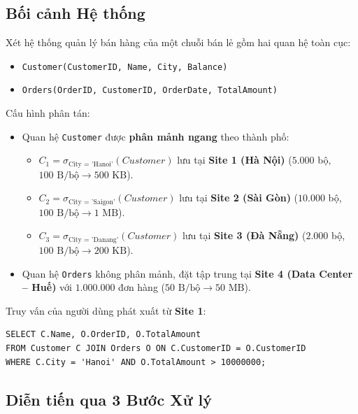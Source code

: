 \documentclass[12pt,a4paper]{report}
\begin{document}
\subsection{Bối cảnh Hệ thống}
Xét hệ thống quản lý bán hàng của một chuỗi bán lẻ gồm hai quan hệ toàn cục:
\begin{itemize}[leftmargin=0.8cm, topsep=1pt, itemsep=1pt]
    \item \texttt{Customer(CustomerID, Name, City, Balance)}
    \item \texttt{Orders(OrderID, CustomerID, OrderDate, TotalAmount)}
\end{itemize}
Cấu hình phân tán:
\begin{itemize}[leftmargin=0.8cm, topsep=1pt, itemsep=1pt]
    \item Quan hệ \texttt{Customer} được \textbf{phân mảnh ngang} theo thành phố:
    \begin{itemize}
        \item $C_1 = \sigma_{\text{City = 'Hanoi'}}(Customer)$ lưu tại \textbf{Site 1 (Hà Nội)} ($5.000$ bộ, $100\text{ B/bộ} \rightarrow 500\text{ KB}$).
        \item $C_2 = \sigma_{\text{City = 'Saigon'}}(Customer)$ lưu tại \textbf{Site 2 (Sài Gòn)} ($10.000$ bộ, $100\text{ B/bộ} \rightarrow 1\text{ MB}$).
        \item $C_3 = \sigma_{\text{City = 'Danang'}}(Customer)$ lưu tại \textbf{Site 3 (Đà Nẵng)} ($2.000$ bộ, $100\text{ B/bộ} \rightarrow 200\text{ KB}$).
    \end{itemize}
    \item Quan hệ \texttt{Orders} không phân mảnh, đặt tập trung tại \textbf{Site 4 (Data Center -- Huế)} với $1.000.000$ đơn hàng ($50\text{ B/bộ} \rightarrow 50\text{ MB}$).
\end{itemize}

Truy vấn của người dùng phát xuất từ \textbf{Site 1}:
\begin{lstlisting}
SELECT C.Name, O.OrderID, O.TotalAmount
FROM Customer C JOIN Orders O ON C.CustomerID = O.CustomerID
WHERE C.City = 'Hanoi' AND O.TotalAmount > 10000000;
\end{lstlisting}

\subsection{Diễn tiến qua 3 Bước Xử lý}
\end{document}
